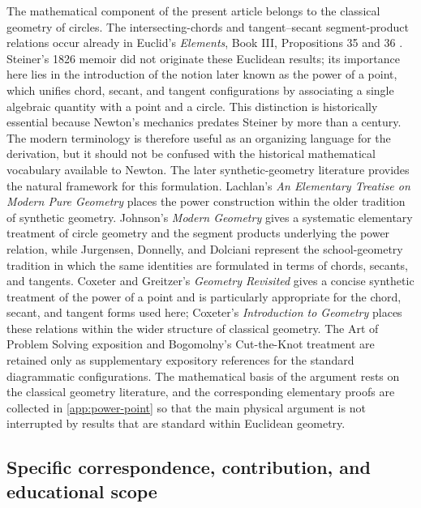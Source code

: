 \documentclass[preprint,12pt,3p,nopreprintline]{elsarticle}
\numberwithin{equation}{section}
\theoremstyle{remark}
\begin{document}
The mathematical component of the present article belongs to the classical geometry of circles. The intersecting-chords and tangent--secant segment-product relations occur already in Euclid's \textit{Elements}, Book III, Propositions 35 and 36 \cite{euclid1956elements}. Steiner's 1826 memoir \cite{steiner1826einige} did not originate these Euclidean results; its importance here lies in the introduction of the notion later known as the power of a point, which unifies chord, secant, and tangent configurations by associating a single algebraic quantity with a point and a circle. This distinction is historically essential because Newton's mechanics predates Steiner by more than a century. The modern terminology is therefore useful as an organizing language for the derivation, but it should not be confused with the historical mathematical vocabulary available to Newton. The later synthetic-geometry literature provides the natural framework for this formulation. Lachlan's \textit{An Elementary Treatise on Modern Pure Geometry} \cite{lachlan1893elementary} places the power construction within the older tradition of synthetic geometry. Johnson's \textit{Modern Geometry} \cite{johnson1929modern} gives a systematic elementary treatment of circle geometry and the segment products underlying the power relation, while Jurgensen, Donnelly, and Dolciani \cite{jurgensen1963modern} represent the school-geometry tradition in which the same identities are formulated in terms of chords, secants, and tangents. Coxeter and Greitzer's \textit{Geometry Revisited} \cite{coxeter1967geometry} gives a concise synthetic treatment of the power of a point and is particularly appropriate for the chord, secant, and tangent forms used here; Coxeter's \textit{Introduction to Geometry} \cite{coxeter1969introduction} places these relations within the wider structure of classical geometry. The Art of Problem Solving exposition \cite{aopsPowerPoint} and Bogomolny's Cut-the-Knot treatment \cite{bogomolnyPowerPoint} are retained only as supplementary expository references for the standard diagrammatic configurations. The mathematical basis of the argument rests on the classical geometry literature, and the corresponding elementary proofs are collected in \ref{app:power-point} so that the main physical argument is not interrupted by results that are standard within Euclidean geometry.

\subsection{Specific correspondence, contribution, and educational scope}
\end{document}
